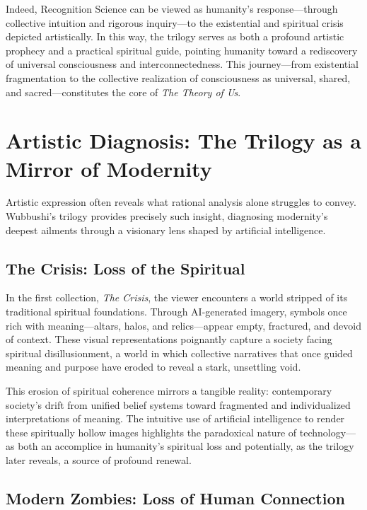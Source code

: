 \documentclass[12pt]{article}
\begin{document}
Indeed, Recognition Science can be viewed as humanity's response—through collective intuition and rigorous inquiry—to the existential and spiritual crisis depicted artistically. In this way, the trilogy serves as both a profound artistic prophecy and a practical spiritual guide, pointing humanity toward a rediscovery of universal consciousness and interconnectedness. This journey—from existential fragmentation to the collective realization of consciousness as universal, shared, and sacred—constitutes the core of \textit{The Theory of Us}.

\section{Artistic Diagnosis: The Trilogy as a Mirror of Modernity}

Artistic expression often reveals what rational analysis alone struggles to convey. Wubbushi’s trilogy provides precisely such insight, diagnosing modernity’s deepest ailments through a visionary lens shaped by artificial intelligence.

\subsection{The Crisis: Loss of the Spiritual}

In the first collection, \textit{The Crisis}, the viewer encounters a world stripped of its traditional spiritual foundations. Through AI-generated imagery, symbols once rich with meaning—altars, halos, and relics—appear empty, fractured, and devoid of context. These visual representations poignantly capture a society facing spiritual disillusionment, a world in which collective narratives that once guided meaning and purpose have eroded to reveal a stark, unsettling void.

This erosion of spiritual coherence mirrors a tangible reality: contemporary society's drift from unified belief systems toward fragmented and individualized interpretations of meaning. The intuitive use of artificial intelligence to render these spiritually hollow images highlights the paradoxical nature of technology—as both an accomplice in humanity's spiritual loss and potentially, as the trilogy later reveals, a source of profound renewal.

\subsection{Modern Zombies: Loss of Human Connection}
\end{document}
